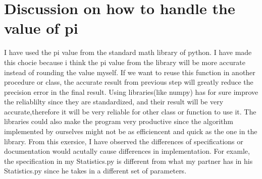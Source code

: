 \documentclass[12pt]{article}
\begin{document}
\newpage
\section*{Discussion on how to handle the value of pi}
I have used the pi value from the standard math library of python. I have made this chocie 
because i think the pi value from the library will be more accurate instead of rounding the 
value myself. If we want to reuse this function in another procedure or class, the accurate 
result from previous step will greatly reduce the precision error in the final result. Using 
libraries(like numpy) has for sure improve the reliablilty since they are standardized, 
and their result will be very accurate,therefore it will be very reliable for other class 
or function to use it. The libraries could also make the program very productive since the 
algorithm implemented by ourselves might not be as efficiencent and quick as the one in 
the library. From this exersice, I have observed the differences of specifications or 
documentation would acutally cause differences in implementation. For examle, the 
specification in my Statistics.py is different from what my partner has in his Statistics.py 
since he takes in a different set of parameters.
\end{document}
